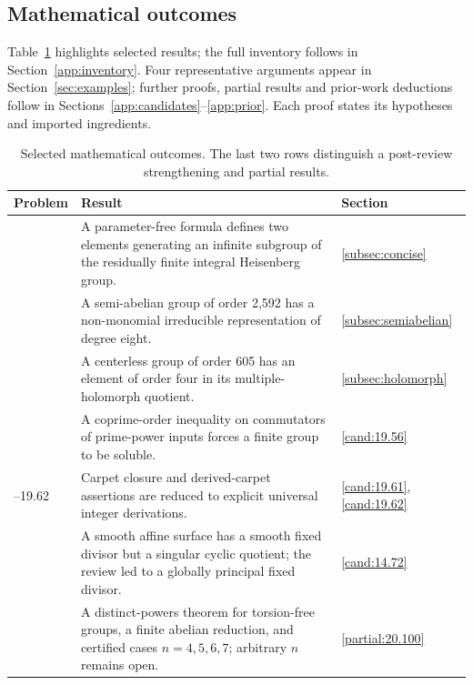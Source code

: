 \subsection{Mathematical outcomes}

Table~\ref{tab:highlights} highlights selected results; the full inventory
follows in Section~\ref{app:inventory}. Four representative arguments
appear in Section~\ref{sec:examples}; further proofs, partial results and
prior-work deductions follow in
Sections~\ref{app:candidates}--\ref{app:prior}. Each proof states its
hypotheses and imported ingredients.

\begin{table}[htbp]
\centering\small
\caption{Selected mathematical outcomes. The last two rows distinguish a
post-review strengthening and partial results.}
\label{tab:highlights}
\begin{tabular}{@{}>{\raggedright\arraybackslash}p{}>{\raggedright\arraybackslash}p{}>{\raggedright\arraybackslash}p{}@{}}
\toprule
Problem & Result & Section\\\midrule
21.106 & A parameter-free formula defines two elements generating an infinite subgroup of the residually finite integral Heisenberg group. & \ref{subsec:concise}\\[3pt]
21.68 & A semi-abelian group of order 2,592 has a non-monomial irreducible representation of degree eight. & \ref{subsec:semiabelian}\\[3pt]
20.108 & A centerless group of order 605 has an element of order four in its multiple-holomorph quotient. & \ref{subsec:holomorph}\\[3pt]
19.56 & A coprime-order inequality on commutators of prime-power inputs forces a finite group to be soluble. & \ref{cand:19.56}\\[3pt]
19.61--19.62 & Carpet closure and derived-carpet assertions are reduced to explicit universal integer derivations. & \ref{cand:19.61}, \ref{cand:19.62}\\[3pt]
14.72 & A smooth affine surface has a smooth fixed divisor but a singular cyclic quotient; the review led to a globally principal fixed divisor. & \ref{cand:14.72}\\[3pt]
20.100 & A distinct-powers theorem for torsion-free groups, a finite abelian reduction, and certified cases \(n=4,5,6,7\); arbitrary \(n\) remains open. & \ref{partial:20.100}\\
\bottomrule
\end{tabular}
\end{table}


